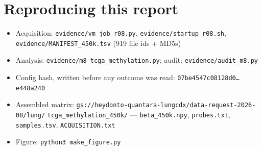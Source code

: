 \documentclass[11pt,a4paper]{article}
\begin{document}
\section{Reproducing this report}

\begin{itemize}[leftmargin=1.2em,itemsep=1pt]
\item Acquisition: \texttt{evidence/vm\_job\_r08.py}, \texttt{evidence/startup\_r08.sh},
      \texttt{evidence/MANIFEST\_450k.tsv} (919 file ids + MD5s)
\item Analysis: \texttt{evidence/m8\_tcga\_methylation.py}; audit:
      \texttt{evidence/audit\_m8.py}
\item Config hash, written before any outcome was read:
      \texttt{07be4547c08128d0\ldots e448a240}
\item Assembled matrix: \texttt{gs://heydonto-quantara-lungcdx/data-request-2026-08/lung/}
      \texttt{tcga\_methylation\_450k/} --- \texttt{beta\_450k.npy}, \texttt{probes.txt},
      \texttt{samples.tsv}, \texttt{ACQUISITION.txt}
\item Figure: \texttt{python3 make\_figure.py}
\end{itemize}
\end{document}
